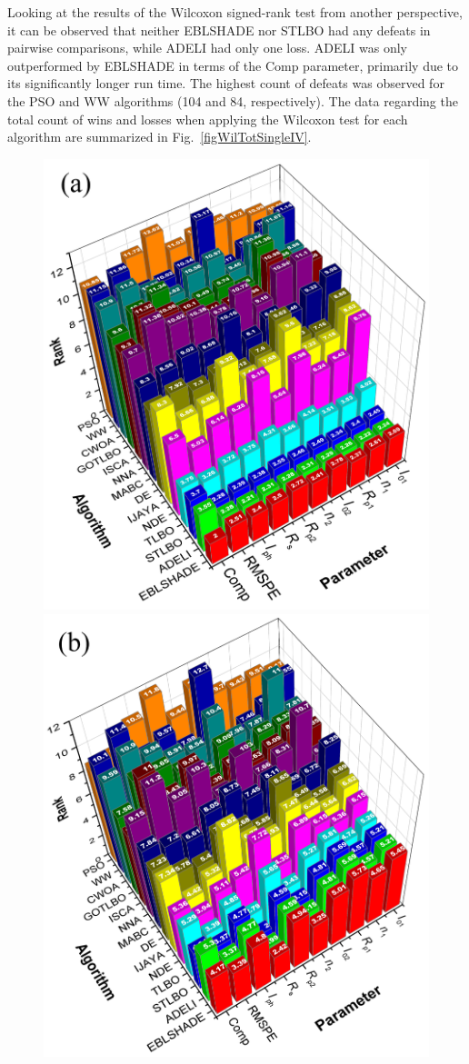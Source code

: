 \documentclass[a4paper,fleqn]{cas-dc}
\begin{document}
Looking at the results of the Wilcoxon signed-rank test from another perspective,
it can be observed that neither EBLSHADE nor STLBO had any defeats in pairwise comparisons,
while ADELI had only one loss.
ADELI was only outperformed by EBLSHADE in terms of the Comp parameter, primarily due to its significantly longer run time.
The highest count of defeats was observed for the PSO and WW algorithms (104 and 84, respectively).
The data regarding the total count of wins and losses when applying the Wilcoxon test
for each algorithm are summarized in Fig.~\ref{figWilTotSingleIV}.

\begin{figure}[!ht]
	\centering
		\includegraphics[width=.76\columnwidth]{Friedman}
        \includegraphics[width=.76\columnwidth]{FriedmanAlignedRank}

\end{figure}
\end{document}
